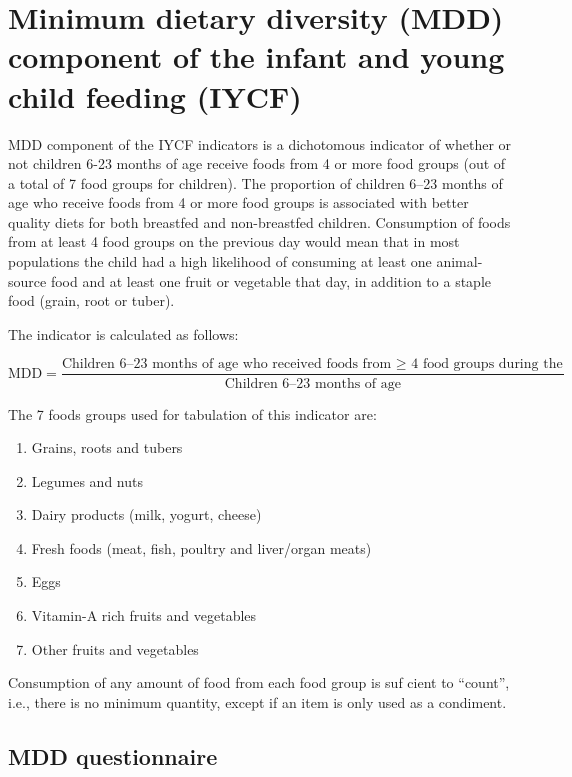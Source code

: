 \documentclass[12pt,]{book}
\providecommand{\tightlist}{%
  \setlength{\itemsep}{0pt}\setlength{\parskip}{0pt}}
\theoremstyle{definition}
\theoremstyle{definition}
\theoremstyle{definition}
\theoremstyle{remark}
\begin{document}
\hypertarget{minimum-dietary-diversity-mdd-component-of-the-infant-and-young-child-feeding-iycf}{%
\section{Minimum dietary diversity (MDD) component of the infant and
young child feeding
(IYCF)}\label{minimum-dietary-diversity-mdd-component-of-the-infant-and-young-child-feeding-iycf}}

MDD component of the IYCF indicators is a dichotomous indicator of
whether or not children 6-23 months of age receive foods from 4 or more
food groups (out of a total of 7 food groups for children). The
proportion of children 6--23 months of age who receive foods from 4 or
more food groups is associated with better quality diets for both
breastfed and non-breastfed children. Consumption of foods from at least
4 food groups on the previous day would mean that in most populations
the child had a high likelihood of consuming at least one animal-source
food and at least one fruit or vegetable that day, in addition to a
staple food (grain, root or tuber).

The indicator is calculated as follows:

\[ \text{MDD} = \frac{\text{Children 6–23 months of age who received foods from ≥ 4 food groups during the previous day}}{\text{Children 6–23 months of age}} \]

The 7 foods groups used for tabulation of this indicator are:

\begin{enumerate}
\def\labelenumi{\arabic{enumi}.}
\tightlist
\item
  Grains, roots and tubers
\item
  Legumes and nuts
\item
  Dairy products (milk, yogurt, cheese)
\item
  Fresh foods (meat, fish, poultry and liver/organ meats)
\item
  Eggs
\item
  Vitamin-A rich fruits and vegetables
\item
  Other fruits and vegetables
\end{enumerate}

Consumption of any amount of food from each food group is suf cient to
``count'', i.e., there is no minimum quantity, except if an item is only
used as a condiment.

\hypertarget{mdd-questionnaire}{%
\subsection{MDD questionnaire}\label{mdd-questionnaire}}
\end{document}
